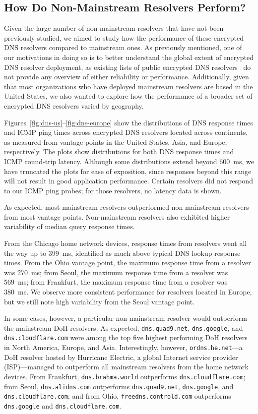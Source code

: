 \subsection{How Do Non-Mainstream Resolvers Perform?}

Given the large number of non-mainstream resolvers that have not been
previously studied, we aimed to study how
the performance of these encrypted DNS resolvers compared to mainstream ones.
As previously mentioned, one of our motivations in doing so is to better
understand the global extent of encrypted DNS resolver deployment, as existing
lists of public encrypted DNS resolvers~\cite{dnscrypt-public-resolvers} do
not provide any overview of either reliability or performance. Additionally,
given that most organizations who have deployed mainstream resolvers are based
in the United States, we also wanted to explore how the performance of a
broader set of encrypted DNS resolvers varied by geography.

Figures~\ref{fig:dns-us}--\ref{fig:dns-europe} show the distributions of DNS
response times and ICMP ping times across encrypted DNS resolvers located across continents, as measured
from vantage points in the United States, Asia, and Europe, respectively. The
plots show distributions for both DNS response times and ICMP round-trip latency. 
Although some distributions extend beyond 600~ms, we have truncated the plots
for ease of exposition, since responses beyond this range will not result in
good application performance.
Certain resolvers did not respond to our ICMP ping probes; for those
resolvers, no latency data is shown.


As expected, most mainstream resolvers outperformed non-mainstream resolvers
from most vantage points.
Non-mainstream resolvers also exhibited higher variability of 
median query response times.  

From the Chicago home network devices, response times from resolvers went all the way up to 
399~ms, identified as much above typical DNS lookup response times.
From the Ohio vantage point, the maximum response time from a resolver was 270~ms; from Seoul,
the maximum response time from a resolver was 569~ms; from Frankfurt, the maximum response time from a resolver was 380~ms. 
We observe more consistent performance for resolvers located in Europe, but we still 
note high variability from the Seoul vantage point. 

In some cases, however, a particular non-mainstream resolver would outperform
the mainstream DoH resolvers.  As expected, \texttt{dns.quad9.net},
\texttt{dns.google}, and \texttt{dns.cloudflare.com} were among the top five
highest performing DoH resolvers in North America, Europe, and Asia.
Interestingly, however, \texttt{ordns.he.net}---a DoH resolver hosted by
Hurricane Electric, a global Internet service provider (ISP)---managed to
outperform all mainstream resolvers from the home network devices. From Frankfurt, \texttt{dns.brahma.world}
outperforms \texttt{dns.cloudflare.com}; from Seoul, \texttt{dns.alidns.com} outperforms \texttt{dns.quad9.net},
\texttt{dns.google}, and \texttt{dns.cloudflare.com}; and from Ohio, \texttt{freedns.controld.com} outperforms \texttt{dns.google}
and \texttt{dns.cloudflare.com}.

